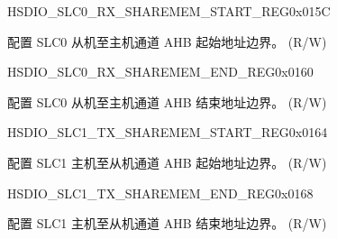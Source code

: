 \begin{register}{H}{SDIO\_SLC0\_RX\_SHAREMEM\_START\_REG}{0x015C}\label{regdesc:SDIOSLC0RXSHAREMEMSTARTREG}
%
\regnewline%
\begin{regdesc}\begin{reglist}
\label{fielddesc:SDIOSDIOSLC0RXSHAREMEMSTARTADDR}\item [SDIO\_SDIO\_SLC0\_RX\_SHAREMEM\_START\_ADDR] 配置 SLC0 从机至主机通道 AHB 起始地址边界。 (R/W)
\end{reglist}\end{regdesc}
\end{register}


\begin{register}{H}{SDIO\_SLC0\_RX\_SHAREMEM\_END\_REG}{0x0160}\label{regdesc:SDIOSLC0RXSHAREMEMENDREG}
%
\regnewline%
\begin{regdesc}\begin{reglist}
\label{fielddesc:SDIOSDIOSLC0RXSHAREMEMENDADDR}\item [SDIO\_SDIO\_SLC0\_RX\_SHAREMEM\_END\_ADDR] 配置 SLC0 从机至主机通道 AHB 结束地址边界。 (R/W)
\end{reglist}\end{regdesc}
\end{register}


\begin{register}{H}{SDIO\_SLC1\_TX\_SHAREMEM\_START\_REG}{0x0164}\label{regdesc:SDIOSLC1TXSHAREMEMSTARTREG}
%
\regnewline%
\begin{regdesc}\begin{reglist}
\label{fielddesc:SDIOSDIOSLC1TXSHAREMEMSTARTADDR}\item [SDIO\_SDIO\_SLC1\_TX\_SHAREMEM\_START\_ADDR] 配置 SLC1 主机至从机通道 AHB 起始地址边界。 (R/W)
\end{reglist}\end{regdesc}
\end{register}


\begin{register}{H}{SDIO\_SLC1\_TX\_SHAREMEM\_END\_REG}{0x0168}\label{regdesc:SDIOSLC1TXSHAREMEMENDREG}
%
\regnewline%
\begin{regdesc}\begin{reglist}
\label{fielddesc:SDIOSDIOSLC1TXSHAREMEMENDADDR}\item [SDIO\_SDIO\_SLC1\_TX\_SHAREMEM\_END\_ADDR] 配置 SLC1 主机至从机通道 AHB 结束地址边界。 (R/W)
\end{reglist}\end{regdesc}
\end{register}


